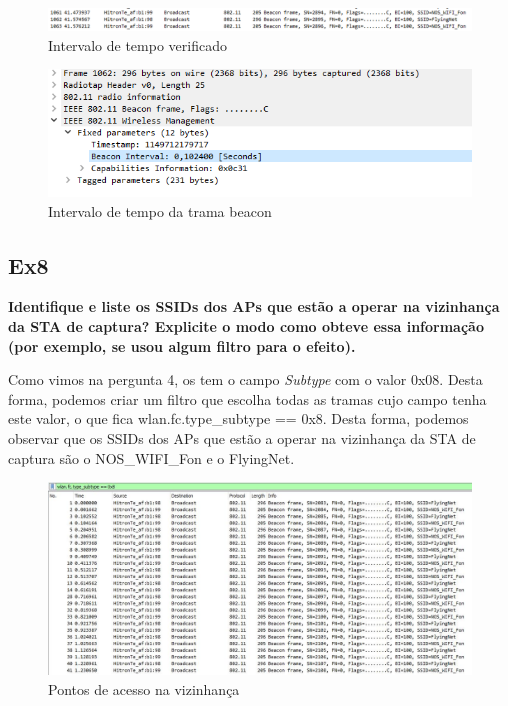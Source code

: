 \documentclass{article}
\begin{document}
\begin{figure}[h]
	\centering
	\includegraphics[scale = 0.5]{ex7TP4.png}
	\caption{Intervalo de tempo verificado}
\end{figure}

\begin{figure}[h]
	\centering
	\includegraphics[scale = 0.8]{ex7.1.png}
	\caption{Intervalo de tempo da trama beacon}
\end{figure}

\subsection{Ex8}
\textbf{Identifique e liste os SSIDs dos APs que estão a operar na vizinhança da STA de captura? Explicite o modo como obteve essa informação (por exemplo, se usou algum filtro para o efeito).}\\\par
Como vimos na pergunta 4, os  tem o campo \textit{Subtype} com o valor 0x08. Desta forma, podemos criar um filtro que escolha todas as tramas cujo campo tenha este valor, o que fica wlan.fc.type\_subtype == 0x8. Desta forma, podemos observar que os SSIDs dos APs que estão a operar na vizinhança da STA de captura são o NOS\_WIFI\_Fon e o FlyingNet.
\begin{figure}[h]
	\centering
	\includegraphics[scale = 0.5]{ex-8.JPG}
	\caption{Pontos de acesso na vizinhança}
\end{figure}
\end{document}
